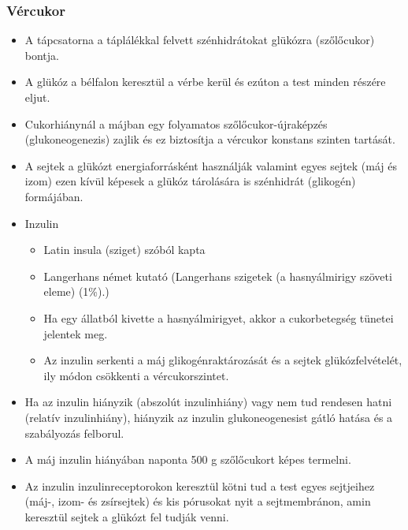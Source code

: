 \subsubsection{Vércukor}
\begin{itemize}
    \item A tápcsatorna a táplálékkal felvett szénhidrátokat glükózra (szőlőcukor) bontja.
    \item A glükóz a bélfalon keresztül a vérbe kerül és ezúton a test minden részére eljut.
    \item Cukorhiánynál a májban egy folyamatos szőlőcukor-újraképzés (glukoneogenezis) zajlik és ez biztosítja a vércukor konstans szinten tartását.
    \item A sejtek a glükózt energiaforrásként használják valamint egyes sejtek (máj és izom) ezen kívül képesek a glükóz tárolására is szénhidrát (glikogén) formájában.
    \item Inzulin
    \begin{itemize}
        \item Latin insula (sziget) szóból kapta
        \item Langerhans német kutató (Langerhans szigetek (a hasnyálmirigy szöveti eleme) (1\%).)
        \item Ha egy állatból kivette a hasnyálmirigyet, akkor a cukorbetegség tünetei jelentek meg.
        \item Az inzulin serkenti a máj glikogénraktározását és a sejtek glükózfelvételét, ily módon csökkenti a vércukorszintet.
    \end{itemize}
    \item Ha az inzulin hiányzik (abszolút inzulinhiány) vagy nem tud rendesen hatni (relatív inzulinhiány), hiányzik az inzulin glukoneogenesist gátló hatása és a szabályozás felborul.
    \item A máj inzulin hiányában naponta 500 g szőlőcukort képes termelni.
    \item Az inzulin inzulinreceptorokon keresztül kötni tud a test egyes sejtjeihez (máj-, izom- és zsírsejtek) és kis pórusokat nyit a sejtmembránon, amin keresztül sejtek a glükózt fel tudják venni.
\end{itemize}

